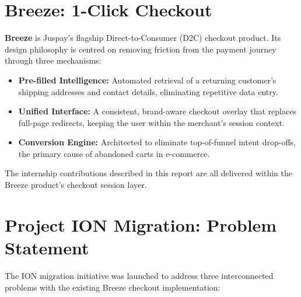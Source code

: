 \section{Breeze: 1-Click Checkout}

\textbf{Breeze} is Juspay's flagship Direct-to-Consumer (D2C) checkout product. Its design philosophy is centred on removing friction from the payment journey through three mechanisms:

\begin{itemize}
  \item \textbf{Pre-filled Intelligence:} Automated retrieval of a returning customer's shipping addresses and contact details, eliminating repetitive data entry.
  \item \textbf{Unified Interface:} A consistent, brand-aware checkout overlay that replaces full-page redirects, keeping the user within the merchant's session context.
  \item \textbf{Conversion Engine:} Architected to eliminate top-of-funnel intent drop-offs, the primary cause of abandoned carts in e-commerce.
\end{itemize}

\par The internship contributions described in this report are all delivered within the Breeze product's checkout session layer.

\section{Project ION Migration: Problem Statement}

The ION migration initiative was launched to address three interconnected problems with the existing Breeze checkout implementation:

